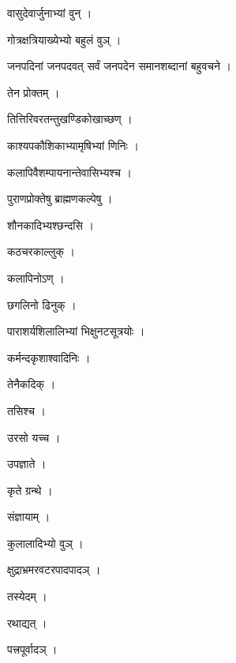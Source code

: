 \documentclass[10pt, openany]{book}
\begin{document}
\noindent वासुदेवार्जुनाभ्यां वुन् ।

\noindent गोत्रक्षत्रियाख्येभ्यो बहुलं वुञ् ।

\noindent जनपदिनां जनपदवत् सर्वं जनपदेन समानशब्दानां बहुवचने ।

\noindent तेन प्रोक्तम् ।

\noindent तित्तिरिवरतन्तुखण्डिकोखाच्छण् ।

\noindent काश्यपकौशिकाभ्यामृषिभ्यां णिनिः ।

\noindent कलापिवैशम्पायनान्तेवासिभ्यश्च ।

\noindent पुराणप्रोक्तेषु ब्राह्मणकल्पेषु ।

\noindent शौनकादिभ्यश्छन्दसि ।

\noindent कठचरकाल्लुक् ।

\noindent कलापिनोऽण् ।

\noindent छगलिनो ढिनुक् ।

\noindent पाराशर्यशिलालिभ्यां भिक्षुनटसूत्रयोः ।

\noindent कर्मन्दकृशाश्वादिनिः ।

\noindent तेनैकदिक् ।

\noindent तसिश्च ।

\noindent उरसो यच्च ।

\noindent उपज्ञाते ।

\noindent कृते ग्रन्थे ।

\noindent संज्ञायाम् ।

\noindent कुलालादिभ्यो वुञ् ।

\noindent क्षुद्राभ्रमरवटरपादपादञ् ।

\noindent तस्येदम् ।

\noindent रथाद्यत् ।

\noindent पत्त्रपूर्वादञ् ।
\end{document}
